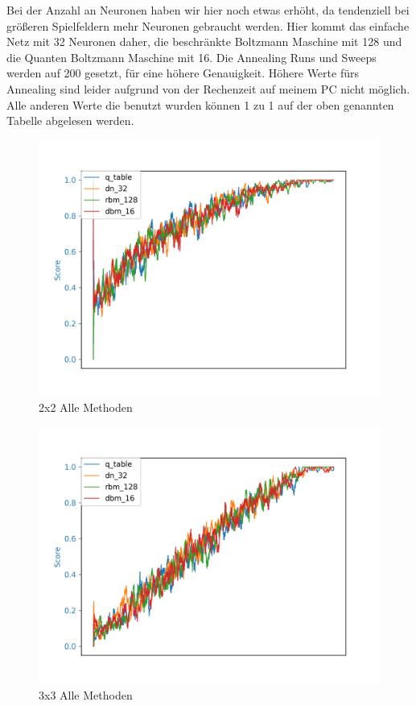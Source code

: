 Bei der Anzahl an Neuronen haben wir hier noch etwas erhöht, da tendenziell bei größeren Spielfeldern mehr Neuronen gebraucht werden. Hier kommt das einfache Netz mit 32 Neuronen daher, die beschränkte Boltzmann Maschine mit 128 und die Quanten Boltzmann Maschine mit 16. Die Annealing Runs und Sweeps werden auf 200 gesetzt, für eine höhere Genauigkeit. Höhere Werte fürs Annealing sind leider aufgrund von der Rechenzeit auf meinem PC nicht möglich. Alle anderen Werte die benutzt wurden können 1 zu 1 auf der oben genannten Tabelle abgelesen werden.

\begin{figure}[H]
\centering
\includegraphics[width=\textwidth]{Figures/all_2x2_q_table_dn_32_rbm_128_dbm_16.png}
\caption{2x2 Alle Methoden}
\label{all_1}
\end{figure}

\begin{figure}[H]
\centering
\includegraphics[width=\textwidth]{Figures/all_3x3_q_table_dn_32_rbm_128_dbm_16.png}
\caption{3x3 Alle Methoden}
\label{all_2}
\end{figure}

